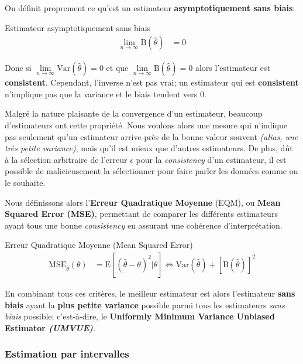 \documentclass[10pt, french]{article}
\begin{document}
\begin{multicols*}{2}
On définit proprement ce qu'est un estimateur \textbf{asymptotiquement sans biais}:
\begin{algo}{Estimateur asymptotiquement sans biais}
\begin{align*}
	\underset{n \rightarrow \infty}{\lim} \text{B}(\hat\theta) &= 0
\end{align*}
\end{algo}

Donc si $\underset{n \rightarrow \infty}{\lim} \text{Var}(\hat\theta) = 0$ et que $\underset{n \rightarrow \infty}{\lim} \text{B}(\hat\theta) = 0$ alors l'estimateur est \textbf{consistent}. 
Cependant, l'inverse n'est pas vrai; un estimateur qui est \textbf{consistent} n'implique pas que la variance et le biais tendent vers 0.

Malgré la nature plaisante de la convergence d'un estimateur, beaucoup d'estimateurs ont cette propriété. 
Nous voulons alors une mesure qui n'indique pas seulement qu'un estimateur arrive près de la bonne valeur souvent \textit{(alias, une très petite variance)}, mais qu'il est mieux que d'autres estimateurs.
De plus, dût à la sélection arbitraire de l'erreur $\epsilon$ pour la \textit{consistency} d'un estimateur, il est possible de malicieusement la sélectionner pour faire parler les données comme on le souhaite. 

Nous définissons alors l'\textbf{Erreur Quadratique Moyenne} (EQM), ou \textbf{Mean Squared Error (MSE)}, permettant de comparer les différents estimateurs ayant tous une bonne \textit{consistency} en assurant une cohérence d'interprétation.
\begin{algo}{Erreur Quadratique Moyenne (Mean Squared Error)}
\begin{align*}
	\text{MSE}_{\hat\theta}(\theta)
	&=	\text{E}[(\hat\theta - \theta)^{2} | \theta]
	\Leftrightarrow	\text{Var}(\hat\theta) + \left[\text{B}(\hat\theta)\right]^{2}
\end{align*}
\end{algo}

En combinant tous ces critères, le meilleur estimateur est alors l'estimateur \textbf{sans biais} ayant la \textbf{plus petite variance} possible parmi tous les estimateurs \textit{sans biais} possible; c'est-à-dire, le \textbf{Uniformly Minimum Variance Unbiased Estimator \textit{(UMVUE)}}.

\subsubsection*{Estimation par intervalles}


\end{multicols*}
\end{document}
